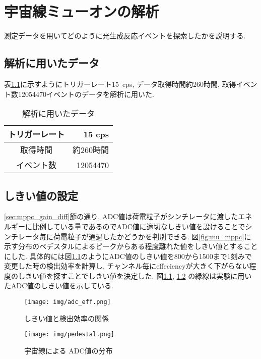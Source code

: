 \chapter{宇宙線ミューオンの解析}\label{analysis}
測定データを用いてどのように光生成反応イベントを探索したかを説明する.

\section{解析に用いたデータ}\label{sec:anal:data}
表\ref{tab:analyzed_data}に示すようにトリガーレート15\ cps, データ取得時間約260時間, 取得イベント数12054470イベントのデータを解析に用いた.
\begin{table}[H]
    \centering
    \caption{解析に用いたデータ}
    \label{tab:analyzed_data}
    \begin{tabular}{|c|r|}
        \hline
        トリガーレート & 15 cps    \\ \hline
        取得時間       & 約260時間 \\ \hline
        イベント数     & 12054470  \\ \hline
    \end{tabular}
\end{table}

\section{しきい値の設定}\label{sec:anal:threshold}
\ref{sec:mppc_gain_diff}節の通り, ADC値は荷電粒子がシンチレータに渡したエネルギーに比例している量であるのでADC値に適切なしきい値を設けることでシンチレータ毎に荷電粒子が通過したかどうかを判別できる.
図\ref{fig:mu_mppc}に示す分布のペデスタルによるピークからある程度離れた値をしきい値とすることにした.
具体的には図\ref{fig:adc_eff}のようにADC値のしきい値を800から1500まで1刻みで変更した時の検出効率を計算し, チャンネル毎にeffeciencyが大きく下がらない程度のしきい値を探すことでしきい値を決定した.
図\ref{fig:adc_eff}, \ref{fig:threhist} の緑線は実験に用いたADC値のしきい値を示している.
\begin{figure}[H]
    \centering
    \texttt{[image: img/adc\_eff.png]}
    \caption{しきい値と検出効率の関係}
    \label{fig:adc_eff}
\end{figure}
\begin{figure}[H]
    \centering
    \texttt{[image: img/pedestal.png]}
    \caption{宇宙線による ADC値の分布}
    \label{fig:threhist}
\end{figure}

